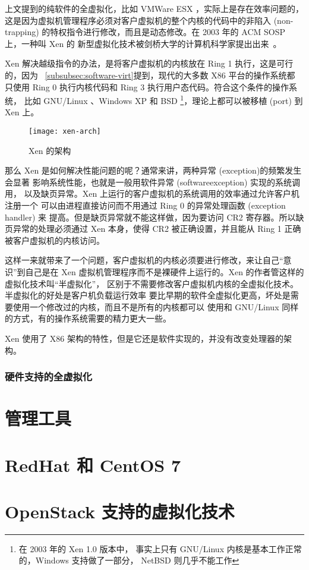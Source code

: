 上文提到的纯软件的全虚拟化，比如 VMWare ESX ，实际上是存在效率问题的，
这是因为虚拟机管理程序必须对客户虚拟机的整个内核的代码中的非陷入 (non-trapping)
的特权指令进行修改，而且是动态修改。在 2003 年的 ACM SOSP 上，一种叫 Xen 的
新型虚拟化技术被剑桥大学的计算机科学家提出出来~\cite{barham2003xen}。

Xen 解决越级指令的办法，是将客户虚拟机的内核放在 Ring 1 执行，这是可行的，因为
~\ref{subsubsec:software-virt}提到，现代的大多数 X86 平台的操作系统都
只使用 Ring 0 执行内核代码和 Ring 3 执行用户态代码。符合这个条件的操作系统，
比如 GNU/Linux 、Windows XP 和 BSD \footnote{在 2003 年的 Xen 1.0 版本中，
事实上只有 GNU/Linux 内核是基本工作正常的，Windows 支持做了一部分，
NetBSD 则几乎不能工作}，理论上都可以被移植 (port) 到 Xen 上。

\begin{figure}[h]
    \centering
    \texttt{[image: xen-arch]}
    \caption{Xen 的架构}
\end{figure}

那么 Xen 是如何解决性能问题的呢？通常来讲，两种异常 (exception)的频繁发生会显著
影响系统性能，也就是一般用软件异常 (softwareexception) 实现的系统调用，
以及缺页异常。Xen 上运行的客户虚拟机的系统调用的效率通过允许客户机注册一个
可以由进程直接访问而不用通过 Ring 0 的异常处理函数 (exception handler) 来
提高。但是缺页异常就不能这样做，因为要访问 CR2 寄存器。所以缺页异常的处理必须通过
Xen 本身，使得 CR2 被正确设置，并且能从 Ring 1 正确被客户虚拟机的内核访问。

这样一来就带来了一个问题，客户虚拟机的内核必须要进行修改，来让自己“意识”到自己是在
Xen 虚拟机管理程序而不是裸硬件上运行的。Xen 的作者管这样的虚拟化技术叫“半虚拟化”，
区别于不需要修改客户虚拟机内核的全虚拟化技术。半虚拟化的好处是客户机负载运行效率
要比早期的软件全虚拟化更高，坏处是需要使用一个修改过的内核，而且不是所有的内核都可以
使用和 GNU/Linux 同样的方式，有的操作系统需要的精力更大一些。

Xen 使用了 X86 架构的特性，但是它还是软件实现的，并没有改变处理器的架构。

\subsubsection{硬件支持的全虚拟化}
\label{subsubsec:hardware-virt}

\section{管理工具}

\section{RedHat 和 CentOS 7}

\section{OpenStack 支持的虚拟化技术}
